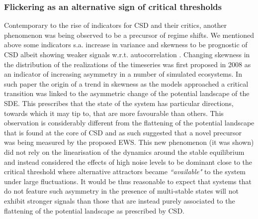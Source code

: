 \documentclass[../main.tex]{subfiles}
\begin{document}
\subsubsection{Flickering as an alternative sign of critical thresholds}\label{subsubsec1.2.3}
Contemporary to the rise of indicators for CSD and their critics, another phenomenon was being observed to be a precursor of regime shifts. We mentioned above some indicators s.a. increase in variance and skewness to be prognostic of CSD albeit showing weaker signals w.r.t. autocorrelation \cite{Biggs09,Drake10,Carpenter11a}.
Changing skewness in the distribution of the realizations of the timeseries was first proposed in 2008 \cite{Guttal08} as an indicator of increasing asymmetry in a number of simulated ecosystems. 
In such paper the origin of a trend in skewness as the models approached a critical transition was linked to the asymmetric change of the potential landscape of the SDE.
This prescribes that the state of the system has particular directions, towards which it may tip to, that are more favourable than others.
This observation is considerably different from the flattening of the potential landscape that is found at the core of CSD and as such suggested that a novel precursor was being measured by the proposed EWS.
This new phenomenon (it was shown) did not rely on the linearisation of the dynamics around the stable equilibrium and instead considered the effects of high noise levels to be dominant close to the critical threshold where alternative attractors became \textit{``available"} to the system under large fluctuations.
It would be thus reasonable to expect that systems that do not feature such asymmetry in the presence of multi-stable states will not exhibit stronger signals than those that are instead purely associated to the flattening of the potential landscape as prescribed by CSD.
\end{document}
